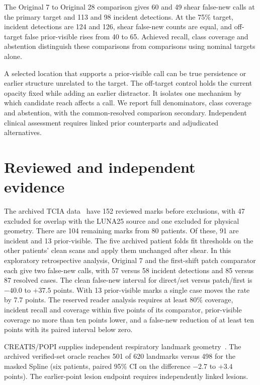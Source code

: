 The Original 7 to Original 28 comparison gives 60 and 49 shear false-new calls at the primary target and 113 and 98 incident detections. At the 75\% target, incident detections are 124 and 126, shear false-new counts are equal, and off-target false prior-visible rises from 40 to 65. Achieved recall, class coverage and abstention distinguish these comparisons from comparisons using nominal targets alone.

A selected location that supports a prior-visible call can be true persistence or earlier structure unrelated to the target. The off-target control holds the current opacity fixed while adding an earlier distractor. It isolates one mechanism by which candidate reach affects a call. We report full denominators, class coverage and abstention, with the common-resolved comparison secondary. Independent clinical assessment requires linked prior counterparts and adjudicated alternatives.

\section{Reviewed and independent evidence}
The archived TCIA data~\cite{gong2025} have 152 reviewed marks before exclusions, with 47 excluded for overlap with the LUNA25 source and one excluded for physical geometry. There are 104 remaining marks from 80 patients. Of these, 91 are incident and 13 prior-visible. The five archived patient folds fit thresholds on the other patients' clean scans and apply them unchanged after shear. In this exploratory retrospective analysis, Original 7 and the first-shift patch comparator each give two false-new calls, with 57 versus 58 incident detections and 85 versus 87 resolved cases. The clean false-new interval for direct/set versus patch/first is $-40.0$ to $+37.5$ points. With 13 prior-visible marks a single case moves the rate by 7.7 points. The reserved reader analysis requires at least 80\% coverage, incident recall and coverage within five points of its comparator, prior-visible coverage no more than ten points lower, and a false-new reduction of at least ten points with its paired interval below zero.

CREATIS/POPI supplies independent respiratory landmark geometry~\cite{vandemeulebroucke2011}. The archived verified-set oracle reaches 501 of 620 landmarks versus 498 for the masked Spline (six patients, paired 95\% CI on the difference $-2.7$ to $+3.4$ points). The earlier-point lesion endpoint requires independently linked lesions.

